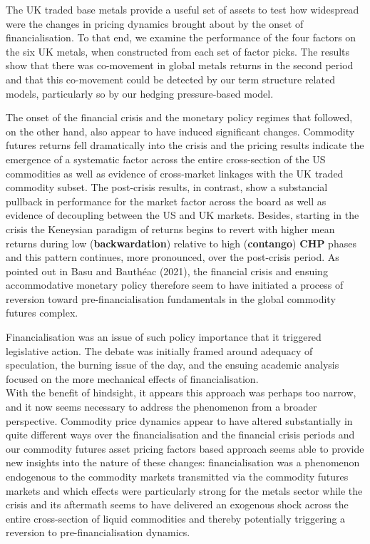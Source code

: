 \documentclass[]{elsarticle} %
\begin{document}
\medskip\setlength{\parindent}{0pt}

The UK traded base metals provide a useful set of assets to test how widespread were the changes in pricing dynamics brought about by the onset of financialisation. To that end, we examine the performance of the four factors on the six UK metals, when constructed from each set of factor picks. The results show that there was co-movement in global metals returns in the second period and that this co-movement could be detected by our term structure related models, particularly so by our hedging pressure-based model.

\medskip\setlength{\parindent}{0pt}

The onset of the financial crisis and the monetary policy regimes that followed, on the other hand, also appear to have induced significant changes. Commodity futures returns fell dramatically into the crisis and the pricing results indicate the emergence of a systematic factor across the entire cross-section of the US commodities as well as evidence of cross-market linkages with the UK traded commodity subset. The post-crisis results, in contrast, show a substancial pullback in performance for the market factor across the board as well as evidence of decoupling between the US and UK markets. Besides, starting in the crisis the Keneysian paradigm of returns begins to revert with higher mean returns during low (\textbf{backwardation}) relative to high (\textbf{contango}) \textbf{CHP} phases and this pattern continues, more pronounced, over the post-crisis period. As pointed out in Basu and Bauthéac (2021), the financial crisis and ensuing accommodative monetary policy therefore seem to have initiated a process of reversion toward pre-financialisation fundamentals in the global commodity futures complex.

\bigskip\bigskip\setlength{\parindent}{0pt}

Financialisation was an issue of such policy importance that it triggered legislative action. The debate was initially framed around adequacy of speculation, the burning issue of the day, and the ensuing academic analysis focused on the more mechanical effects of financialisation.\\
With the benefit of hindsight, it appears this approach was perhaps too narrow, and it now seems necessary to address the phenomenon from a broader perspective. Commodity price dynamics appear to have altered substantially in quite different ways over the financialisation and the financial crisis periods and our commodity futures asset pricing factors based approach seems able to provide new insights into the nature of these changes: financialisation was a phenomenon endogenous to the commodity markets transmitted via the commodity futures markets and which effects were particularly strong for the metals sector while the crisis and its aftermath seems to have delivered an exogenous shock across the entire cross-section of liquid commodities and thereby potentially triggering a reversion to pre-financialisation dynamics.
\end{document}
